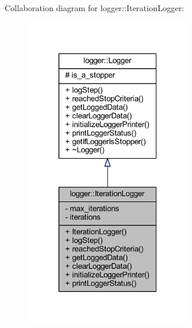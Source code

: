 Collaboration diagram for logger\+:\+:Iteration\+Logger\+:\nopagebreak
\begin{figure}[H]
\begin{center}
\leavevmode
\includegraphics[width=205pt]{classlogger_1_1_iteration_logger__coll__graph}
\end{center}
\end{figure}
